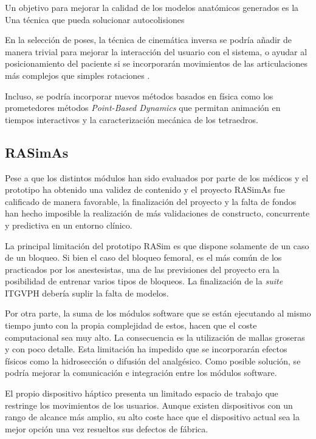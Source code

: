 Un objetivo para mejorar la calidad de los modelos anatómicos generados es la Una técnica que pueda solucionar autocolisiones \cite{Vaillant:2014}

En la selección de poses, la técnica de cinemática inversa \cite{Shi:2007} se podría añadir de manera trivial para mejorar la interacción del usuario con el sistema, o ayudar al posicionamiento del paciente si se incorporarán movimientos de las articulaciones más complejos que simples rotaciones \cite{joints}.

Incluso, se podría incorporar nuevos métodos basados en física como los prometedores métodos  \emph{Point-Based Dynamics}  \cite{abu2015position} que permitan animación en tiempos interactivos y la caracterización mecánica de los tetraedros.




\subsection{RASimAs}

Pese a que los distintos módulos han sido evaluados por parte de los médicos y el prototipo  ha obtenido una validez de contenido y el proyecto \ac{RASimAs} fue calificado de manera favorable, la finalización del proyecto y la falta de fondos han hecho imposible la realización de más validaciones de constructo, concurrente y predictiva en un entorno clínico.    %

La principal limitación del prototipo \ac{RASim} es que dispone solamente de un caso de un bloqueo. Si bien el caso del bloqueo femoral, es el más común de los practicados por los anestesistas, una de las previsiones del proyecto era la posibilidad de entrenar varios tipos de bloqueos. La finalización  de la \emph{suite} \ac{ITGVPH} debería suplir la falta de modelos.

Por otra parte, la suma de los módulos software que se están ejecutando al mismo tiempo junto con la propia complejidad de estos, hacen que el coste computacional sea muy alto. La consecuencia es la utilización de mallas groseras y con poco detalle. Esta limitación ha impedido que se incorporarán efectos físicos como la hidrosección o difusión del analgésico. Como posible solución, se podría mejorar la comunicación e integración entre los módulos software.

El propio dispositivo háptico presenta un limitado espacio de trabajo que restringe los movimientos de los usuarios. Aunque existen dispositivos con un rango de alcance más amplio, su  alto coste hace que el dispositivo actual sea la mejor opción una vez resueltos sus defectos de fábrica.

